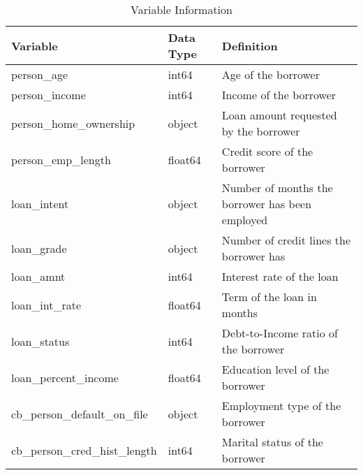 \begin{table}[H]\centering
\caption{Variable Information}
\label{Table 1:variable_info}
\begin{tabular}{lll}
\toprule
Variable & Data Type & Definition \\
\midrule
person_age & int64 & Age of the borrower \\
person_income & int64 & Income of the borrower \\
person_home_ownership & object & Loan amount requested by the borrower \\
person_emp_length & float64 & Credit score of the borrower \\
loan_intent & object & Number of months the borrower has been employed \\
loan_grade & object & Number of credit lines the borrower has \\
loan_amnt & int64 & Interest rate of the loan \\
loan_int_rate & float64 & Term of the loan in months \\
loan_status & int64 & Debt-to-Income ratio of the borrower \\
loan_percent_income & float64 & Education level of the borrower \\
cb_person_default_on_file & object & Employment type of the borrower \\
cb_person_cred_hist_length & int64 & Marital status of the borrower \\
\bottomrule
\end{tabular}
\end{table}
